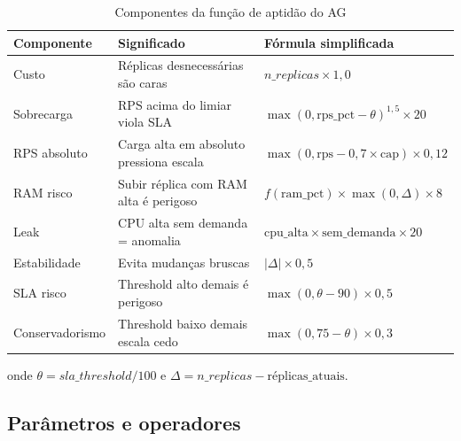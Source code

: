 \documentclass[12pt, a4paper]{article}
\begin{document}
\begin{table}[H]
  \centering
  \caption{Componentes da função de aptidão do AG}
  \label{tab:fitness}
  \begin{tabularx}{\textwidth}{lXl}
    \toprule
    \rowcolor{headerblue}
    \textbf{Componente} & \textbf{Significado} & \textbf{Fórmula simplificada} \\
    \midrule
    Custo           & Réplicas desnecessárias são caras & $n\_replicas \times 1{,}0$ \\
    Sobrecarga      & RPS acima do limiar viola SLA & $\max(0, \text{rps\_pct} - \theta)^{1{,}5} \times 20$ \\
    RPS absoluto    & Carga alta em absoluto pressiona escala & $\max(0, \text{rps} - 0{,}7 \times \text{cap}) \times 0{,}12$ \\
    RAM risco       & Subir réplica com RAM alta é perigoso & $f(\text{ram\_pct}) \times \max(0, \Delta) \times 8$ \\
    Leak            & CPU alta sem demanda = anomalia & $\text{cpu\_alta} \times \text{sem\_demanda} \times 20$ \\
    Estabilidade    & Evita mudanças bruscas & $|\Delta| \times 0{,}5$ \\
    SLA risco       & Threshold alto demais é perigoso & $\max(0, \theta - 90) \times 0{,}5$ \\
    Conservadorismo & Threshold baixo demais escala cedo & $\max(0, 75 - \theta) \times 0{,}3$ \\
    \bottomrule
  \end{tabularx}
\end{table}

onde $\theta = sla\_threshold / 100$ e $\Delta = n\_replicas - \text{réplicas\_atuais}$.

\subsection{Parâmetros e operadores}
\label{sec:ag_params}
\end{document}
